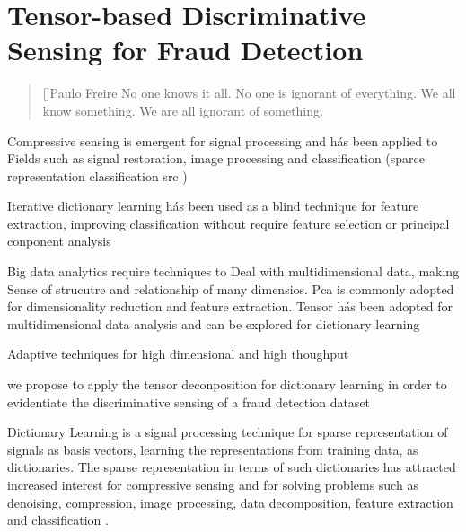 \chapter{Tensor-based Discriminative Sensing for Fraud Detection}
\label{ch:4_tensor_dl}

\begin{quotation}[]{Paulo Freire}
No one knows it all. No one is ignorant of everything. We all know something. We are all ignorant of something.
\end{quotation}


Compressive sensing is emergent for signal processing and hás been applied to Fields such as signal restoration, image processing and classification (sparce representation classification src )

Iterative dictionary learning hás been used as a blind technique for feature extraction, improving classification without require feature selection or principal conponent analysis

Big data analytics require techniques to Deal with multidimensional data, making Sense of strucutre and relationship of many dimensios. Pca is commonly adopted for dimensionality reduction and feature extraction. Tensor hás been adopted for multidimensional data analysis and can be explored for dictionary learning

Adaptive techniques for high dimensional and high thoughput

we propose to apply the tensor deconposition for dictionary learning in order to evidentiate the discriminative sensing of a fraud detection dataset

Dictionary Learning is a signal processing technique for sparse representation of signals as basis vectors, learning the representations from training data, as dictionaries. The sparse representation in terms of such dictionaries has attracted increased interest for compressive sensing and for solving problems such as denoising, compression, image processing, data decomposition, feature extraction and classification \cite{tosic2011dictionary, zhang2010discriminative, zhu2016coupled,ravishankar2011mr}.

